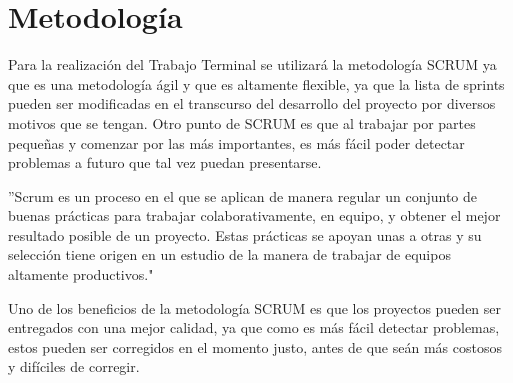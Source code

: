 
\section{Metodología}
Para la realización del Trabajo Terminal se utilizará la metodología SCRUM ya que es una metodología ágil y que es altamente flexible, ya que la lista de sprints pueden ser modificadas en el transcurso del desarrollo del proyecto por diversos motivos que se tengan. Otro punto de SCRUM es que al trabajar por partes pequeñas y comenzar por las más importantes, es más fácil poder detectar problemas a futuro que tal vez puedan presentarse\cite{Referencia11}.

''Scrum es un proceso en el que se aplican de manera regular un conjunto de buenas prácticas para trabajar colaborativamente, en equipo, y obtener el mejor resultado posible de un proyecto. Estas prácticas se apoyan unas a otras y su selección tiene origen en un estudio de la manera de trabajar de equipos altamente productivos."\cite{Referencia13}

Uno de los beneficios de la metodología SCRUM es que los proyectos pueden ser entregados con una mejor calidad, ya que como es más fácil detectar problemas, estos pueden ser corregidos en el momento justo, antes de que seán más costosos y difíciles de corregir. 


